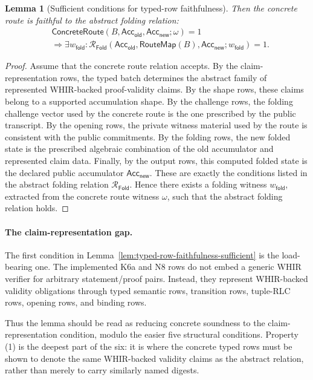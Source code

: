 \documentclass[11pt]{article}
\newtheorem{lemma}[theorem]{Lemma}
\theoremstyle{definition}
\newcommand{\Acc}{\mathsf{Acc}}
\newcommand{\Rfold}{\mathcal{R}_{\mathsf{Fold}}}
\begin{document}
\begin{lemma}[Sufficient conditions for typed-row faithfulness]
Then the concrete route is faithful to the abstract folding relation:
\[
  \begin{aligned}
    &\mathsf{ConcreteRoute}
    \left(
      B,
      \Acc_{\mathsf{old}},
      \Acc_{\mathsf{new}};
      \omega
    \right)=1
    \\
    &\Longrightarrow
    \exists w_{\mathsf{fold}}:
    \Rfold\!\left(
      \Acc_{\mathsf{old}},
      \mathsf{RouteMap}(B),
      \Acc_{\mathsf{new}};
      w_{\mathsf{fold}}
    \right)=1.
  \end{aligned}
\]
\end{lemma}

\begin{proof}
Assume that the concrete route relation accepts. By the claim-representation
rows, the typed batch determines the abstract family of represented
WHIR-backed proof-validity claims. By the shape rows, these claims belong to a
supported accumulation shape. By the challenge rows, the folding challenge vector
used by the concrete route is the one prescribed by the public transcript. By
the opening rows, the private witness material used by the route is consistent
with the public commitments. By the folding rows, the new folded state is the
prescribed algebraic combination of the old accumulator and represented claim
data. Finally, by the output rows, this computed folded state is the declared
public accumulator \(\Acc_{\mathsf{new}}\). These are exactly the conditions
listed in the abstract folding relation \(\Rfold\). Hence there exists a
folding witness \(w_{\mathsf{fold}}\), extracted from the concrete route witness
\(\omega\), such that the abstract folding relation holds.
\end{proof}

\paragraph{The claim-representation gap.}
The first condition in Lemma~\ref{lem:typed-row-faithfulness-sufficient} is the
load-bearing one. The implemented K6a and N8 rows do not embed a generic WHIR
verifier for arbitrary statement/proof pairs. Instead, they represent
WHIR-backed validity obligations through typed semantic rows, transition rows,
tuple-RLC rows, opening rows, and binding rows.

Thus the lemma should be read as reducing concrete soundness to the
claim-representation condition, modulo the easier five structural conditions.
Property (1) is the deepest part of the six: it is where the concrete typed rows
must be shown to denote the same WHIR-backed validity claims as the abstract
relation, rather than merely to carry similarly named digests.
\end{document}

